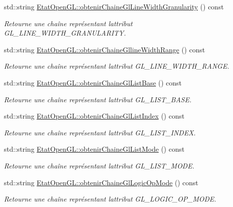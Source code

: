 \begin{DoxyCompactItemize}
std\+::string \hyperlink{group__utilitaire_ga42e5a43f490a0f90bedf54064921de10}{Etat\+Open\+G\+L\+::obtenir\+Chaine\+Gl\+Line\+Width\+Granularity} () const 
\begin{DoxyCompactList}\small\item\em Retourne une chaîne représentant l\textquotesingle{}attribut G\+L\+\_\+\+L\+I\+N\+E\+\_\+\+W\+I\+D\+T\+H\+\_\+\+G\+R\+A\+N\+U\+L\+A\+R\+I\+T\+Y. \end{DoxyCompactList}\item 
std\+::string \hyperlink{group__utilitaire_gacdf3e63f9464f755958fb682f2a45015}{Etat\+Open\+G\+L\+::obtenir\+Chaine\+Glline\+Width\+Range} () const 
\begin{DoxyCompactList}\small\item\em Retourne une chaîne représentant l\textquotesingle{}attribut G\+L\+\_\+\+L\+I\+N\+E\+\_\+\+W\+I\+D\+T\+H\+\_\+\+R\+A\+N\+G\+E. \end{DoxyCompactList}\item 
std\+::string \hyperlink{group__utilitaire_ga869ac6c34aaec533fb74b4e8095ae993}{Etat\+Open\+G\+L\+::obtenir\+Chaine\+Gl\+List\+Base} () const 
\begin{DoxyCompactList}\small\item\em Retourne une chaîne représentant l\textquotesingle{}attribut G\+L\+\_\+\+L\+I\+S\+T\+\_\+\+B\+A\+S\+E. \end{DoxyCompactList}\item 
std\+::string \hyperlink{group__utilitaire_ga4486b4e688ef8a216e16b7c1a6ec7a61}{Etat\+Open\+G\+L\+::obtenir\+Chaine\+Gl\+List\+Index} () const 
\begin{DoxyCompactList}\small\item\em Retourne une chaîne représentant l\textquotesingle{}attribut G\+L\+\_\+\+L\+I\+S\+T\+\_\+\+I\+N\+D\+E\+X. \end{DoxyCompactList}\item 
std\+::string \hyperlink{group__utilitaire_ga75eb73d049c2865922e414f5a06b749a}{Etat\+Open\+G\+L\+::obtenir\+Chaine\+Gl\+List\+Mode} () const 
\begin{DoxyCompactList}\small\item\em Retourne une chaîne représentant l\textquotesingle{}attribut G\+L\+\_\+\+L\+I\+S\+T\+\_\+\+M\+O\+D\+E. \end{DoxyCompactList}\item 
std\+::string \hyperlink{group__utilitaire_gaf88292802715427e1a4e58f591b8e67e}{Etat\+Open\+G\+L\+::obtenir\+Chaine\+Gl\+Logic\+Op\+Mode} () const 
\begin{DoxyCompactList}\small\item\em Retourne une chaîne représentant l\textquotesingle{}attribut G\+L\+\_\+\+L\+O\+G\+I\+C\+\_\+\+O\+P\+\_\+\+M\+O\+D\+E. \end{DoxyCompactList}\item 

\end{DoxyCompactItemize}
